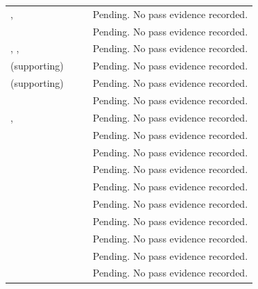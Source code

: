 \begin{tabularx}{\linewidth}{L{2.9cm}L{2.45cm}L{2.45cm}Y}
,  &  &  & Pending. No pass evidence recorded.\\
 &  &  & Pending. No pass evidence recorded.\\
, ,  &  &  & Pending. No pass evidence recorded.\\
 (supporting) &  &  & Pending. No pass evidence recorded.\\
 (supporting) &  &  & Pending. No pass evidence recorded.\\
 &  &  & Pending. No pass evidence recorded.\\
,  &  &  & Pending. No pass evidence recorded.\\
 &  &  & Pending. No pass evidence recorded.\\
 &  &  & Pending. No pass evidence recorded.\\
 &  &  & Pending. No pass evidence recorded.\\
 &  &  & Pending. No pass evidence recorded.\\
 &  &  & Pending. No pass evidence recorded.\\
 &  &  & Pending. No pass evidence recorded.\\
 &  &  & Pending. No pass evidence recorded.\\
 &  &  & Pending. No pass evidence recorded.\\
 &  &  & Pending. No pass evidence recorded.\\

\end{tabularx}
